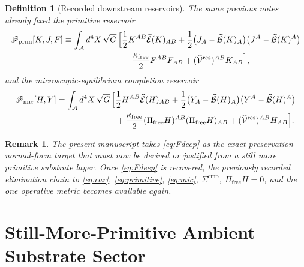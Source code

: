 \documentclass[11pt]{article}
\newcommand{\Sub}{\mathcal A}
\newcommand{\ResidualLift}{\widehat{\mathcal V}^{\mathrm{res}}}
\newcommand{\SubEinLin}{\widehat{\mathcal E}}
\newcommand{\SubGaugeVec}{\widehat{\mathcal B}}
\newcommand{\FreeProj}{\Pi_{\mathrm{free}}}
\newcommand{\GaugeAux}{Y}
\newcommand{\MicFunctional}{\mathscr F_{\mathrm{mic}}}
\newcommand{\PrimFunctional}{\mathscr F_{\mathrm{prim}}}
\newcommand{\FreeStiff}{\kappa_{\mathrm{free}}}
\newcommand{\PrimStrain}{K}
\newcommand{\PrimNeutral}{J}
\newcommand{\PrimFree}{F}
\newtheorem{definition}{Definition}
\newtheorem{remark}{Remark}
\begin{document}
\begin{definition}[Recorded downstream reservoirs]
\label{def:downstream}
The same previous notes already fixed the primitive reservoir
\begin{equation}
\begin{aligned}
\PrimFunctional[\PrimStrain,\PrimNeutral,\PrimFree]
\equiv
\int_{\Sub} d^4X\,\sqrt{G}\,
\Bigl[
&\frac12 \PrimStrain^{AB}\SubEinLin(\PrimStrain)_{AB}
+\frac12\bigl(\PrimNeutral_A-\SubGaugeVec(\PrimStrain)_A\bigr)
\bigl(\PrimNeutral^A-\SubGaugeVec(\PrimStrain)^A\bigr)
\\
&+\frac{\FreeStiff}{2}\PrimFree^{AB}\PrimFree_{AB}
+(\ResidualLift)^{AB}\PrimStrain_{AB}
\Bigr],
\end{aligned}
\label{eq:primitive}
\end{equation}
and the microscopic-equilibrium completion reservoir
\begin{equation}
\begin{aligned}
\MicFunctional[H,\GaugeAux]
=
\int_{\Sub} d^4X\,\sqrt{G}\,
\Bigl[
&\frac12 H^{AB}\SubEinLin(H)_{AB}
+\frac12\bigl(\GaugeAux_A-\SubGaugeVec(H)_A\bigr)
\bigl(\GaugeAux^A-\SubGaugeVec(H)^A\bigr)
\\
&+\frac{\FreeStiff}{2}(\FreeProj H)^{AB}(\FreeProj H)_{AB}
+(\ResidualLift)^{AB}H_{AB}
\Bigr].
\end{aligned}
\label{eq:mic}
\end{equation}
\end{definition}

\begin{remark}
The present manuscript takes \eqref{eq:Fdeep} as the exact-preservation normal-form target that must now be derived or justified from a still more primitive substrate layer. Once \eqref{eq:Fdeep} is recovered, the previously recorded elimination chain to \eqref{eq:car}, \eqref{eq:primitive}, \eqref{eq:mic}, \(\Sigma^{\mathrm{cmp}}\), \(\Pi_{\mathrm{free}}H=0\), and the one operative metric becomes available again.
\end{remark}

\section{Still-More-Primitive Ambient Substrate Sector}
\end{document}
